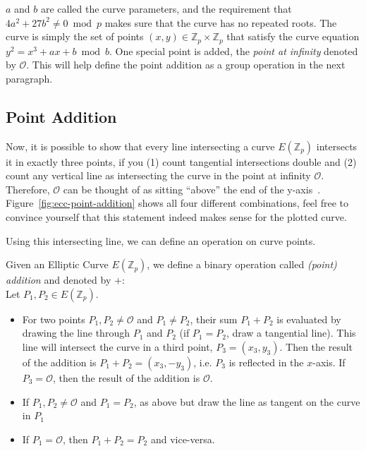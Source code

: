 $a$ and $b$ are called the curve parameters, and the requirement that $4a^2 + 27b^2 \neq 0 \bmod{p}$ makes sure that the curve has no repeated roots.
The curve is simply the set of points $(x, y) \in \mathbb{Z}_p \times \mathbb{Z}_p$ that satisfy the curve equation $y^2 = x^3 + a x + b \bmod{b}$.
One special point is added, the \emph{point at infinity} denoted by $\mathcal{O}$. This will help define the point addition as a group operation in the next paragraph.~\cite{katz_introduction_2015}

\subsection{Point Addition}
Now, it is possible to show that every line intersecting a curve $E(\mathbb{Z}_p)$ intersects it in exactly three points, if you (1) count tangential intersections double and (2) count any vertical line as intersecting the curve in the point at infinity $\mathcal{O}$.
Therefore, $\mathcal{O}$ can be thought of as sitting ``above'' the end of the y-axis~\cite{katz_introduction_2015}.
Figure~\ref{fig:ecc-point-addition} shows all four different combinations, feel free to convince yourself that this statement indeed makes sense for the plotted curve.

Using this intersecting line, we can define an operation on curve points.
\begin{definition}
    \label{def:point-add}
    Given an Elliptic Curve $E(\mathbb{Z}_p)$, we define a binary operation called \emph{(point) addition} and denoted by $+$:~\cite{katz_introduction_2015}\\
    Let $P_1, P_2 \in E(\mathbb{Z}_p)$.

    \begin{itemize}
        \item For two points $P_1, P_2 \neq \mathcal{O}$ and $P_1 \neq P_2$, their sum $P_1 + P_2$ is evaluated by drawing the line through $P_1$ and $P_2$ (if $P_1 = P_2$, draw a tangential line). 
            This line will intersect the curve in a third point, $P_3 = (x_3, y_3)$.
            Then the result of the addition is $P_1 + P_2 = (x_3, -y_3)$, i.e. $P_3$ is reflected in the $x$-axis.
            If $P_3 = \mathcal{O}$, then the result of the addition is $\mathcal{O}$.
        \item If $P_1, P_2 \neq \mathcal{O}$ and $P_1 = P_2$, as above but draw the line as tangent on the curve in $P_1$
        \item If $P_1 = \mathcal{O}$, then $P_1 + P_2 = P_2$ and vice-versa.
    \end{itemize}
\end{definition} 

